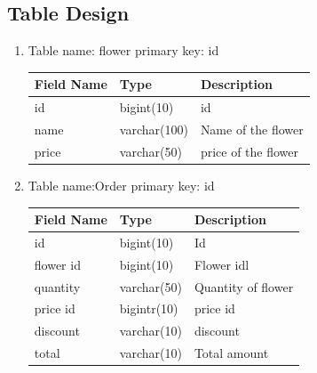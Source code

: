 \documentclass[a4paper,12pt]{article}
\begin{document}
\subsection{Table Design}
\vspace{9mm}
\begin{enumerate} 
\item Table name: flower
\newline primary key: id
\vspace{9mm}\newline
\begin{tabular}{|l|l|l|} 
\hline
Field Name&Type&Description\\
 \hline 
id &bigint(10)&id \\ 
\hline
name&varchar(100)&Name of the flower\\
\hline
price&varchar(50)&price of the flower\\
\hline

 \end{tabular}
\vspace{9mm}
\item  Table name:Order
\newline primary key: id
\vspace{5mm}\newline
\begin{tabular}{|l|l|l|} 
\hline
Field Name&Type&Description\\
 \hline 
id&bigint(10)&Id\\
\hline 
flower id&bigint(10)&Flower idl\\
\hline 
quantity&varchar(50)&Quantity of flower\\
\hline
price id&bigintr(10)&price id\\
\hline
discount&varchar(10)&discount\\
\hline
total&varchar(10)&Total amount\\
\hline
 \end{tabular}


\end{enumerate}
\end{document}
